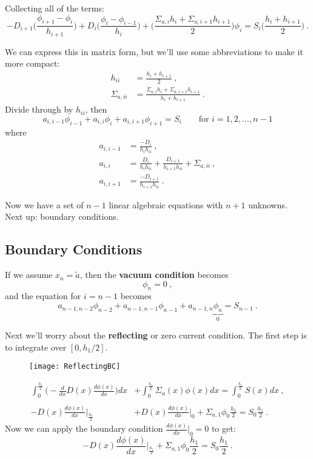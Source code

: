 \documentclass[12pt]{article}
\begin{document}
Collecting all of the terms:
%
\begin{equation}
-D_{i+1}\biggl(\frac{\phi_{i+1} - \phi_i}{h_{i+1}}\biggr) + D_{i}\biggl(\frac{\phi_{i} - \phi_{i-1}}{h_{i}}\biggr) + \biggl(\frac{\Sigma_{a,i}h_i + \Sigma_{a,i+1}h_{i+1}}{2} \biggr)\phi_i =   S_i \bigl(\frac{h_i + h_{i+1}}{2}\bigr) \:.\nonumber
\end{equation}

We can express this in matrix form, but we'll use some abbreviations to make it more compact:
\begin{align}
h_{ii} &= \frac{h_i + h_{i+1}}{2} \:,\nonumber \\
%
\Sigma_{a,ii} &= \frac{\Sigma_{a,i}h_i + \Sigma_{a,i+1}h_{i+1}}{h_i + h_{i+1}} \:. \nonumber
\end{align}
Divide through by $h_{ii}$, then
%
\[a_{i,i-1} \phi_{i-1} + a_{i,i}\phi_i + a_{i, i+1} \phi_{i+1} = S_i \qquad \text{for } i = 1, 2, \dots, n-1\]
%
where
%
\begin{align}
a_{i,i-1} &= \frac{-D_i}{h_i h_{ii}} \:,\nonumber \\
a_{i,i} &= \frac{D_i}{h_i h_{ii}} + \frac{D_{i+1}}{h_{i+1} h_{ii}} +\Sigma_{a,ii} \:, \nonumber \\
a_{i,i+1} &= \frac{-D_{i+1}}{h_{i+1} h_{ii}} \:.\nonumber
\end{align}

Now we have a set of $n-1$ linear algebraic equations with $n+1$ unknowns. \\
Next up: boundary conditions.


\subsection*{Boundary Conditions}

If we assume $x_n = \tilde{a}$, then the \textbf{vacuum condition} becomes
\[\phi_n = 0\:,\]
and the equation for $i=n-1$ becomes
\[a_{n-1,n-2} \phi_{n-2} + a_{n-1,n-1}\phi_{n-1} + a_{n-1, n} \underbrace{\phi_{n}}_{0} = S_{n-1}\:.\]

Next we'll worry about the \textbf{reflecting} or zero current condition. The first step is to integrate over $[0, h_{1}/2]$.
%
\begin{figure}[h!]
\texttt{[image: ReflectingBC]}
\end{figure}
%
\begin{align*}
\int_{0}^{\frac{h_{1}}{2}} \biggl(-\frac{d}{dx}D(x)\frac{d \phi(x)}{dx}\biggr) dx &+ \int_{0}^{\frac{h_{1}}{2}} \Sigma_a(x) \phi(x) dx = \int_{0}^{\frac{h_{1}}{2}} S(x) dx \nonumber \:,\\
%
&\\
%
-D(x)\frac{d \phi(x)}{dx}\big|_{\frac{h_{1}}{2}} &+ D(x)\frac{d \phi(x)}{dx}\big|_{0} + \Sigma_{a,1}\phi_0 \frac{h_1}{2} = S_0 \frac{h_1}{2} \:.\nonumber 
\end{align*}
%
Now we can apply the boundary condition $\frac{d \phi(x)}{dx}\big|_{0} = 0$ to get:
\[-D(x)\frac{d \phi(x)}{dx}\big|_{\frac{h_{1}}{2}} + \Sigma_{a,1}\phi_0 \frac{h_1}{2} = S_0 \frac{h_1}{2}\:.\]
\end{document}

